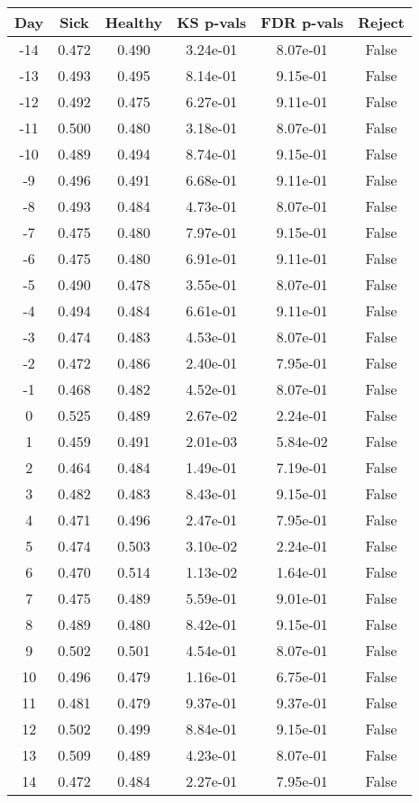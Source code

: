 \begin{tabular}{c|c|c|c|c|c}
Day &  Sick & Healthy &  KS p-vals & FDR p-vals & Reject\\
\hline
-14 & 0.472 &   0.490 &   3.24e-01 &   8.07e-01 &  False\\
-13 & 0.493 &   0.495 &   8.14e-01 &   9.15e-01 &  False\\
-12 & 0.492 &   0.475 &   6.27e-01 &   9.11e-01 &  False\\
-11 & 0.500 &   0.480 &   3.18e-01 &   8.07e-01 &  False\\
-10 & 0.489 &   0.494 &   8.74e-01 &   9.15e-01 &  False\\
 -9 & 0.496 &   0.491 &   6.68e-01 &   9.11e-01 &  False\\
 -8 & 0.493 &   0.484 &   4.73e-01 &   8.07e-01 &  False\\
 -7 & 0.475 &   0.480 &   7.97e-01 &   9.15e-01 &  False\\
 -6 & 0.475 &   0.480 &   6.91e-01 &   9.11e-01 &  False\\
 -5 & 0.490 &   0.478 &   3.55e-01 &   8.07e-01 &  False\\
 -4 & 0.494 &   0.484 &   6.61e-01 &   9.11e-01 &  False\\
 -3 & 0.474 &   0.483 &   4.53e-01 &   8.07e-01 &  False\\
 -2 & 0.472 &   0.486 &   2.40e-01 &   7.95e-01 &  False\\
 -1 & 0.468 &   0.482 &   4.52e-01 &   8.07e-01 &  False\\
  0 & 0.525 &   0.489 &   2.67e-02 &   2.24e-01 &  False\\
  1 & 0.459 &   0.491 &   2.01e-03 &   5.84e-02 &  False\\
  2 & 0.464 &   0.484 &   1.49e-01 &   7.19e-01 &  False\\
  3 & 0.482 &   0.483 &   8.43e-01 &   9.15e-01 &  False\\
  4 & 0.471 &   0.496 &   2.47e-01 &   7.95e-01 &  False\\
  5 & 0.474 &   0.503 &   3.10e-02 &   2.24e-01 &  False\\
  6 & 0.470 &   0.514 &   1.13e-02 &   1.64e-01 &  False\\
  7 & 0.475 &   0.489 &   5.59e-01 &   9.01e-01 &  False\\
  8 & 0.489 &   0.480 &   8.42e-01 &   9.15e-01 &  False\\
  9 & 0.502 &   0.501 &   4.54e-01 &   8.07e-01 &  False\\
 10 & 0.496 &   0.479 &   1.16e-01 &   6.75e-01 &  False\\
 11 & 0.481 &   0.479 &   9.37e-01 &   9.37e-01 &  False\\
 12 & 0.502 &   0.499 &   8.84e-01 &   9.15e-01 &  False\\
 13 & 0.509 &   0.489 &   4.23e-01 &   8.07e-01 &  False\\
 14 & 0.472 &   0.484 &   2.27e-01 &   7.95e-01 &  False\\
\end{tabular}
